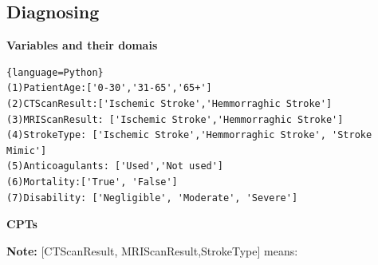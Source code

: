 \documentclass[a4paper, 11pt]{article}
\begin{document}
\subsection{Diagnosing}
\label{sec:bayesian-networks}
\textbf{Variables and their domais}
\begin{lstlisting}{language=Python}
(1)PatientAge:['0-30','31-65','65+']
(2)CTScanResult:['Ischemic Stroke','Hemmorraghic Stroke']
(3)MRIScanResult: ['Ischemic Stroke','Hemmorraghic Stroke']
(4)StrokeType: ['Ischemic Stroke','Hemmorraghic Stroke', 'Stroke Mimic']
(5)Anticoagulants: ['Used','Not used']
(6)Mortality:['True', 'False']
(7)Disability: ['Negligible', 'Moderate', 'Severe']
\end{lstlisting}
\textbf{CPTs}

\textbf{Note:} [CTScanResult, MRIScanResult,StrokeType] means:
\end{document}
